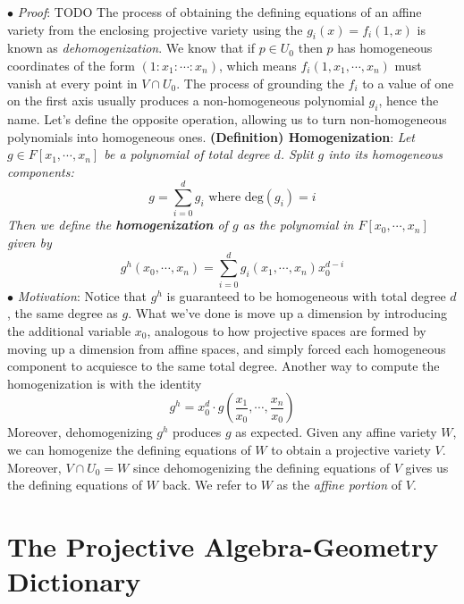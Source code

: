 \documentclass{article}
\newcommand*{\tb}{\textbf}
\newcommand*{\ti}{\textit}
\newcommand*{\n}{\newline}
\newcommand*{\nn}{\newline \newline}
\newcommand*{\Pf}{\indent \ensuremath{\bullet} \textit{Proof}: }
\newcommand*{\Mo}{\indent \ensuremath{\bullet} \textit{Motivation}: }
\newcommand*{\Fx}{\ensuremath{F[x_1, \cdots, x_n]}}
\begin{document}
\n
\Pf TODO
\nn
The process of obtaining the defining equations of an affine variety from the enclosing projective variety using the $ g_i(x) = f_i(1, x) $ is known as \ti{dehomogenization}. We know that if $ p \in U_0 $ then $ p $ has homogeneous coordinates of the form $ (1 : x_1 : \cdots : x_n) $, which means $ f_i(1, x_1, \cdots, x_n) $ must vanish at every point in $ V \cap U_0 $. The process of grounding the $ f_i $ to a value of one on the first axis usually produces a non-homogeneous polynomial $ g_i $, hence the name. Let's define the opposite operation, allowing us to turn non-homogeneous polynomials into homogeneous ones.
\nn
\tb{(Definition) Homogenization}: \ti{Let $ g \in \Fx $ be a polynomial of total degree $ d $. Split $ g $ into its homogeneous components:}
$$ g = \sum_{i = 0}^d g_i \text{ where } \text{deg}(g_i) = i $$
\indent \ti{Then we define the \tb{homogenization} of $ g $ as the polynomial in $ F[x_0, \cdots, x_n] $ given by}
$$ g^h(x_0, \cdots, x_n) = \sum_{i = 0}^d g_i(x_1, \cdots, x_n) x_0^{d - i} $$
\n
\Mo Notice that $ g^h $ is guaranteed to be homogeneous with total degree $ d $, the same degree as $ g $. What we've done is move up a dimension by introducing the additional variable $ x_0 $, analogous to how projective spaces are formed by moving up a dimension from affine spaces, and simply forced each homogeneous component to acquiesce to the same total degree. Another way to compute the homogenization is with the identity
$$ g^h = x_0^d \cdot g \left( \frac{x_1}{x_0}, \cdots, \frac{x_n}{x_0} \right) $$
\indent Moreover, dehomogenizing $ g^h $ produces $ g $ as expected.
\nn
Given any affine variety $ W $, we can homogenize the defining equations of $ W $ to obtain a projective variety $ V $. Moreover, $ V \cap U_0 = W $ since dehomogenizing the defining equations of $ V $ gives us the defining equations of $ W $ back. We refer to $ W $ as the \ti{affine portion} of $ V $.

\section{The Projective Algebra-Geometry Dictionary}
\end{document}
